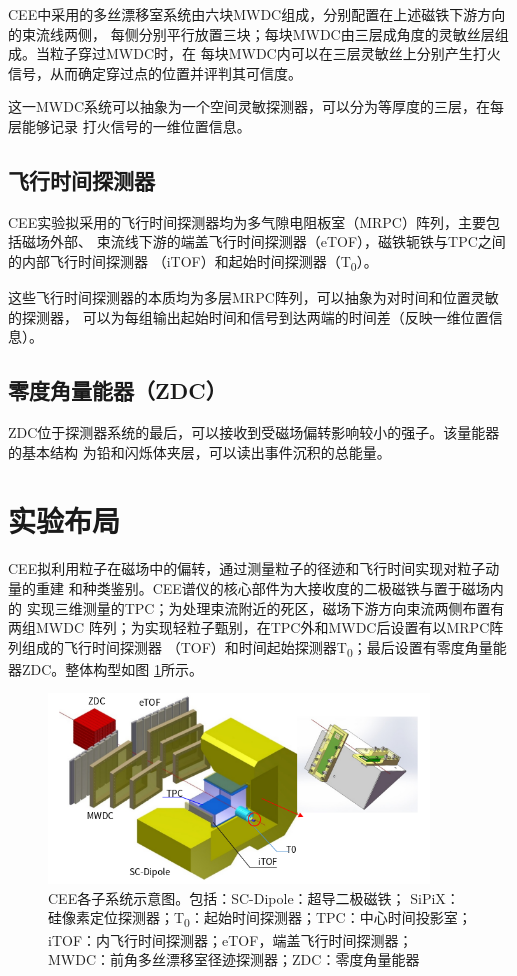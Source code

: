 \documentclass[bachelor,openany,oneside,color]{buaathesis}
\def\TZ{T\textsubscript{0}}
\begin{document}
CEE中采用的多丝漂移室系统由六块MWDC组成，分别配置在上述磁铁下游方向的束流线两侧，
每侧分别平行放置三块；每块MWDC由三层成角度的灵敏丝层组成。当粒子穿过MWDC时，在
每块MWDC内可以在三层灵敏丝上分别产生打火信号，从而确定穿过点的位置并评判其可信度。

这一MWDC系统可以抽象为一个空间灵敏探测器，可以分为等厚度的三层，在每层能够记录
打火信号的一维位置信息。

\subsection{飞行时间探测器}

CEE实验拟采用的飞行时间探测器均为多气隙电阻板室（MRPC）阵列，主要包括磁场外部、
束流线下游的端盖飞行时间探测器（eTOF），磁铁轭铁与TPC之间的内部飞行时间探测器
（iTOF）和起始时间探测器（\TZ）。

这些飞行时间探测器的本质均为多层MRPC阵列，可以抽象为对时间和位置灵敏的探测器，
可以为每组输出起始时间和信号到达两端的时间差（反映一维位置信息）。

\subsection{零度角量能器（ZDC）}

ZDC位于探测器系统的最后，可以接收到受磁场偏转影响较小的强子。该量能器的基本结构
为铅和闪烁体夹层，可以读出事件沉积的总能量。

\section{实验布局}

CEE拟利用粒子在磁场中的偏转，通过测量粒子的径迹和飞行时间实现对粒子动量的重建
和种类鉴别。\cite{技术文档}CEE谱仪的核心部件为大接收度的二极磁铁与置于磁场内的
实现三维测量的TPC；为处理束流附近的死区，磁场下游方向束流两侧布置有两组MWDC
阵列；为实现轻粒子甄别，在TPC外和MWDC后设置有以MRPC阵列组成的飞行时间探测器
（TOF）和时间起始探测器\TZ；最后设置有零度角量能器ZDC。整体构型如图
\ref{fig:CEE:Subsystem}所示。

\begin{figure}\centering
	\includegraphics[width=0.9\textwidth]{./resource/CEE-Subsystem.png}
	\captionsetup{width=0.9\textwidth}
	\caption{CEE各子系统示意图。包括：SC-Dipole：超导二极磁铁；
		SiPiX：硅像素定位探测器；\TZ：起始时间探测器；TPC：中心时间投影室；
		iTOF：内飞行时间探测器；eTOF，端盖飞行时间探测器；
		MWDC：前角多丝漂移室径迹探测器；ZDC：零度角量能器}
	\label{fig:CEE:Subsystem}
\end{figure}
\end{document}
